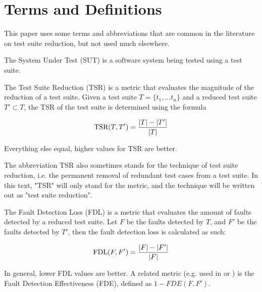 
\chapter{Terms and Definitions}\label{chapter:terms}

This paper uses some terms and abbreviations that are common in the
literature on test suite reduction, but not used much elsewhere.

The System Under Test (SUT) is a software system being tested using a
test suite.

The Test Suite Reduction (TSR) is a metric that evaluates the magnitude
of the reduction of a test suite. Given a test suite $T=\{t_1, \dots t_n\}$ and
a reduced test suite $T' \subset T$, the TSR of the test suite is determined
using the formula

$$\hbox{TSR}(T, T')=\frac{|T|-|T'|}{|T|}$$

Everything else equal, higher values for TSR are better.

The abbreviation TSR also sometimes stands for the technique of test
suite reduction, i.e. the permanent removal of redundant test cases
from a test suite. In this text, "TSR" will only stand for the metric,
and the technique will be written out as "test suite reduction".

The Fault Detection Loss (FDL) is a metric that evaluates the amount of
faults detected by a reduced test suite. Let $F$ be the faults detected
by $T$, and $F'$ be the faults detected by $T'$, then the fault detection
loss is calculated as such:

$$\hbox{FDL}(F, F')=\frac{|F|-|F'|}{|F|}$$

In general, lower FDL values are better. A related metric (e.g. used in
\cite{khan2016survey} or \cite{yoo2012regression}) is the Fault Detection
Effectiveness (FDE), defined as $1-FDE(F, F')$.
